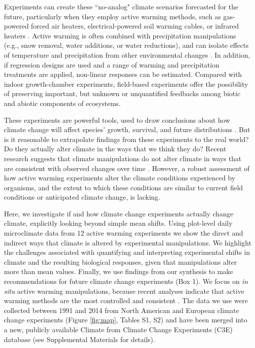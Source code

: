 \documentclass{article}
\begin{document}
\par Experiments can create these ``no-analog" climate scenarios forecasted for the future, particularly when they employ active warming methods, such as gas-powered forced air heaters, electrical-powered soil warming cables, or infrared heaters \citep{shaver2000,williams2007b,aronson2009}. Active warming is often combined with precipitation manipulations (e.g., snow removal, water additions, or water reductions), and can isolate effects of temperature and precipitation from other environmental changes \citep [e.g.,][]{price1998,cleland2006,sherry2007,rollinson2012}. In addition, if regression designs are used \citep[e.g.,][]{pelini2011} and a range of warming and precipitation treatments are applied, non-linear responses can be estimated. Compared with indoor growth-chamber experiments, field-based experiments offer the possibility of preserving important, but unknown or unquantified feedbacks among biotic and abiotic components of ecosystems. 
\par These experiments are powerful tools, used to draw conclusions about how climate change will affect species' growth, survival, and future distributions \citep{dukes1999,hobbie1999,reich2015,gruner2016}. But is it reasonable to extrapolate findings from these experiments to the real world? Do they actually alter climate in the ways that we think they do? Recent research suggests that climate manipulations do not alter climate in ways that are consistent with observed changes over time \citep{wolkovich2012}. However, a robust assessment of how active warming experiments alter the climate conditions experienced by organisms, and the extent to which these conditions are similar to current field conditions or anticipated climate change, is lacking. 
\par Here, we investigate if and how climate change experiments actually change climate, explicitly looking beyond simple mean shifts. Using plot-level daily microclimate data from 12 active warming experiments we show the direct and indirect ways that climate is altered by experimental manipulations. We highlight the challenges associated with quantifying and interpreting experimental shifts in climate and the resulting biological responses, given that manipulations alter more than mean values. Finally, we use findings from our synthesis to make recommendations for future climate change experiments (Box 1). We focus on \textit{in situ} active warming manipulations, because recent analyses indicate that active warming methods are the most controlled and consistent \citep{kimball2005,kimball2008,aronson2009,wolkovich2012}. The data we use were collected between 1991 and 2014 from North American and European climate change experiments (Figure \ref{fig:map}, Tables S1, S2) and have been merged into a new, publicly available Climate from Climate Change Experiments (C3E) database (see Supplemental Materials for details). 
\end{document}
